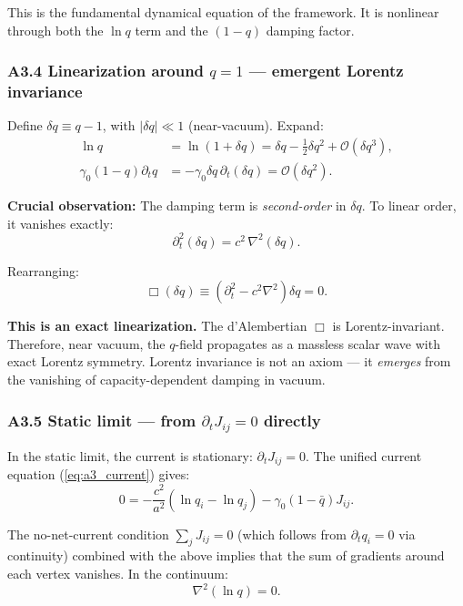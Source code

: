 \documentclass[reprint]{revtex4-2}
\begin{document}
This is the fundamental dynamical equation of the framework. It is nonlinear through both the $\ln q$ term and the $(1-q)$ damping factor.

\subsubsection{A3.4 Linearization around $q=1$ --- emergent Lorentz invariance}

Define $\delta q \equiv q-1$, with $|\delta q| \ll 1$ (near-vacuum). Expand:
\begin{align}
\ln q &= \ln(1 + \delta q) = \delta q - \frac{1}{2}\delta q^2 + \mathcal{O}(\delta q^3), \\
\gamma_0(1-q)\partial_t q &= -\gamma_0\delta q\,\partial_t(\delta q) = \mathcal{O}(\delta q^2).
\end{align}

\textbf{Crucial observation:} The damping term is \emph{second-order} in $\delta q$. To linear order, it vanishes exactly:
\begin{equation}
\partial_t^2(\delta q) = c^2\,\nabla^2(\delta q).
\end{equation}

Rearranging:
\begin{equation}
\boxed{\Box(\delta q) \equiv \left(\partial_t^2 - c^2\nabla^2\right)\delta q = 0}.
\label{eq:a3_dalembert}
\end{equation}

\textbf{This is an exact linearization.} The d'Alembertian $\Box$ is Lorentz-invariant. Therefore, near vacuum, the $q$-field propagates as a massless scalar wave with exact Lorentz symmetry. Lorentz invariance is not an axiom --- it \emph{emerges} from the vanishing of capacity-dependent damping in vacuum.

\subsubsection{A3.5 Static limit --- from $\partial_t J_{ij}=0$ directly}

In the static limit, the current is stationary: $\partial_t J_{ij} = 0$. The unified current equation (\ref{eq:a3_current}) gives:
\begin{equation}
0 = -\frac{c^2}{a^2}(\ln q_i - \ln q_j) - \gamma_0(1-\bar{q})J_{ij}.
\end{equation}

The no-net-current condition $\sum_j J_{ij} = 0$ (which follows from $\partial_t q_i = 0$ via continuity) combined with the above implies that the sum of gradients around each vertex vanishes. In the continuum:
\begin{equation}
\boxed{\nabla^2(\ln q) = 0}.
\label{eq:a3_static}
\end{equation}
\end{document}
